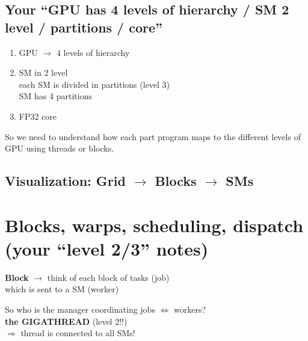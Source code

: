 \documentclass[11pt]{article}
\newcommand{\blue}[1]{\textcolor{myblue}{#1}}
\newcommand{\red}[1]{\textcolor{myred}{#1}}
\begin{document}
\subsection*{\blue{Your “GPU has 4 levels of hierarchy / SM 2 level / partitions / core”}}
\begin{enumerate}
\item GPU $\rightarrow$ 4 levels of hierarchy
\item SM in 2 level \\
\quad each SM is divided in partitions (level 3) \\
\quad SM has 4 partitions
\item FP32 core
\end{enumerate}

So we need to understand how each part program maps to the different levels of GPU using threads or blocks.

\subsection*{\blue{Visualization: Grid $\rightarrow$ Blocks $\rightarrow$ SMs}}
\begin{center}
\end{center}

\section{\blue{Blocks, warps, scheduling, dispatch (your “level 2/3” notes)}}

\textbf{Block} $\rightarrow$ think of each block of tasks (job)\\
\quad which is sent to a SM (worker)

So who is the manager coordinating jobs $\Leftrightarrow$ workers?\\
\textbf{the GIGATHREAD} \red{(level 2!!)}\\
\quad $\Rightarrow$ thread is connected to all SMs!
\end{document}
